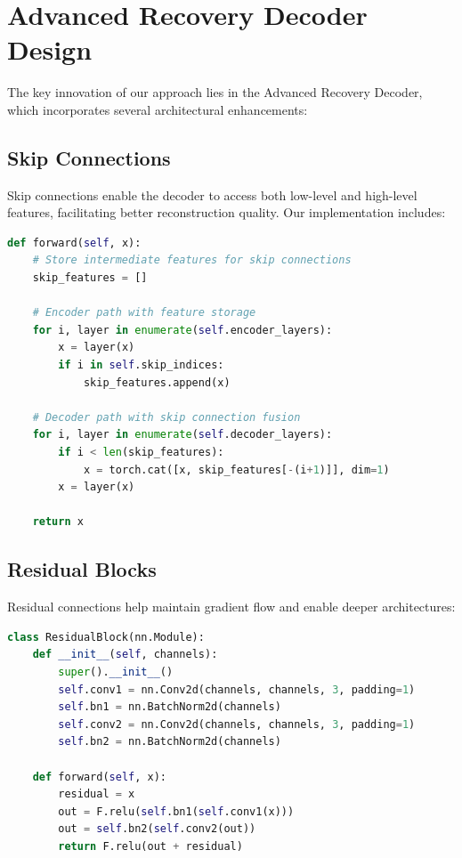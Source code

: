 \documentclass[12pt,a4paper]{report}
\begin{document}
\section{Advanced Recovery Decoder Design}

The key innovation of our approach lies in the Advanced Recovery Decoder, which incorporates several architectural enhancements:

\subsection{Skip Connections}

Skip connections enable the decoder to access both low-level and high-level features, facilitating better reconstruction quality. Our implementation includes:

\begin{lstlisting}[language=Python, caption=Skip Connection Implementation]
def forward(self, x):
    # Store intermediate features for skip connections
    skip_features = []
    
    # Encoder path with feature storage
    for i, layer in enumerate(self.encoder_layers):
        x = layer(x)
        if i in self.skip_indices:
            skip_features.append(x)
    
    # Decoder path with skip connection fusion
    for i, layer in enumerate(self.decoder_layers):
        if i < len(skip_features):
            x = torch.cat([x, skip_features[-(i+1)]], dim=1)
        x = layer(x)
    
    return x
\end{lstlisting}

\subsection{Residual Blocks}

Residual connections help maintain gradient flow and enable deeper architectures:

\begin{lstlisting}[language=Python, caption=Residual Block Implementation]
class ResidualBlock(nn.Module):
    def __init__(self, channels):
        super().__init__()
        self.conv1 = nn.Conv2d(channels, channels, 3, padding=1)
        self.bn1 = nn.BatchNorm2d(channels)
        self.conv2 = nn.Conv2d(channels, channels, 3, padding=1)
        self.bn2 = nn.BatchNorm2d(channels)
        
    def forward(self, x):
        residual = x
        out = F.relu(self.bn1(self.conv1(x)))
        out = self.bn2(self.conv2(out))
        return F.relu(out + residual)
\end{lstlisting}
\end{document}

